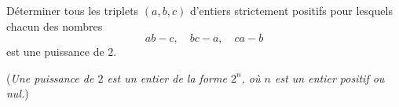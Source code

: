 Déterminer tous les triplets $(a, b, c)$ d'entiers strictement positifs pour lesquels chacun des nombres
\[
ab - c, \quad bc - a, \quad ca - b
\]
est une puissance de $2$.

(\emph{Une puissance de $2$ est un entier de la forme $2^n$, où $n$ est un entier positif ou nul.})
